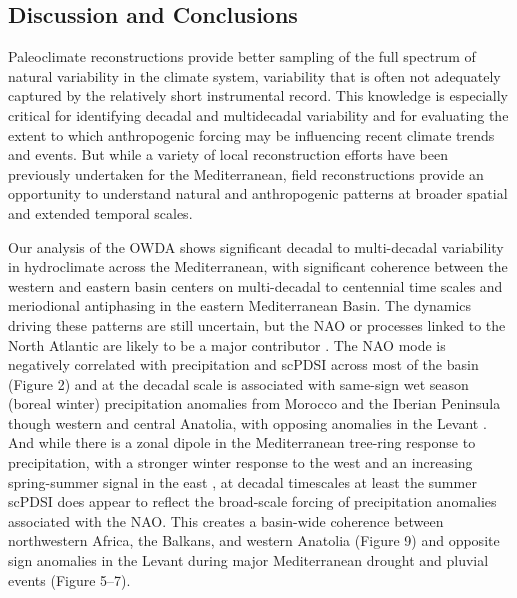 \documentclass[draft,jgr]{AGUTeX}
\begin{document}
\begin{article}
\section{Discussion and Conclusions}
\noindent Paleoclimate reconstructions provide better sampling of the full spectrum of natural variability in the climate system, variability that is often not adequately captured by the relatively short instrumental record. This knowledge is especially critical for identifying decadal and multidecadal variability and for evaluating the extent to which anthropogenic forcing may be influencing recent climate trends and events. But while a variety of local reconstruction efforts have been previously undertaken for the Mediterranean, field reconstructions provide an opportunity to understand natural and anthropogenic patterns at broader spatial and extended temporal scales.

\indent Our analysis of the OWDA shows significant decadal to multi-decadal variability in hydroclimate across the Mediterranean, with significant coherence between the western and eastern basin centers on multi-decadal to centennial time scales and meriodional antiphasing in the eastern Mediterranean Basin. The dynamics driving these patterns are still uncertain, but the NAO or processes linked to the North Atlantic are likely to be a major contributor \citep{Hurrell:vanLoon1997,Eshel:Farrell2000}. The NAO mode is negatively correlated with precipitation and scPDSI across most of the basin (Figure 2) and at the decadal scale is associated with same-sign wet season (boreal winter) precipitation anomalies from Morocco and the Iberian Peninsula though western and central Anatolia, with opposing anomalies in the Levant \citep{Mariotti:etal2002,Xoplaki:etal2004}. And while there is a zonal dipole in the Mediterranean tree-ring response to precipitation, with a stronger winter response to the west and an increasing spring-summer signal in the east \citep{Touchan:etal2014a,Touchan:etal2014b}, at decadal timescales at least the summer scPDSI does appear to reflect the broad-scale forcing of precipitation anomalies associated with the NAO. This creates a basin-wide coherence between northwestern Africa, the Balkans, and western Anatolia (Figure 9) and opposite sign anomalies in the Levant during major Mediterranean drought and pluvial events (Figure 5--7).  


\end{article}
\end{document}
